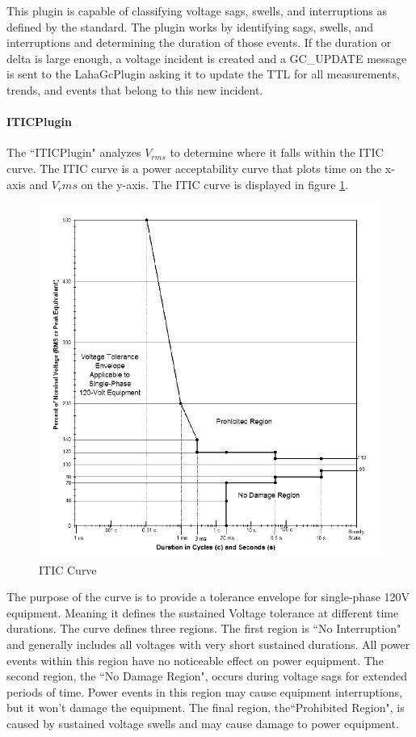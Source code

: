 This plugin is capable of classifying voltage sags, swells, and interruptions as defined by the standard. The plugin works by identifying sags, swells, and interruptions and determining the duration of those events. If the duration or delta is large enough, a voltage incident is created and a GC\_UPDATE message is sent to the LahaGcPlugin asking it to update the TTL for all measurements, trends, and events that belong to this new incident.

\paragraph{ITICPlugin}
The ``ITICPlugin" analyzes $V_{rms}$ to determine where it falls within the ITIC curve\cite{thallam2000power}. The ITIC curve is a power acceptability curve that plots time on the x-axis and $V_rms$ on the y-axis. The ITIC curve is displayed in figure \ref{fig:IticCurve}.

\begin{figure}
	\centering
	\includegraphics[width=\linewidth]{figures/itic.png}
	\caption{ITIC Curve}
	\label{fig:IticCurve}
\end{figure}

The purpose of the curve is to provide a tolerance envelope for single-phase 120V equipment. Meaning it defines the sustained Voltage tolerance at different time durations. The curve defines three regions. The first region is ``No Interruption" and generally includes all voltages with very short sustained durations. All power events within this region have no noticeable effect on power equipment. The second region, the ``No Damage Region", occurs during voltage sags for extended periods of time. Power events in this region may cause equipment interruptions, but it won't damage the equipment. The final region, the``Prohibited Region", is caused by sustained voltage swells and may cause damage to power equipment. 

